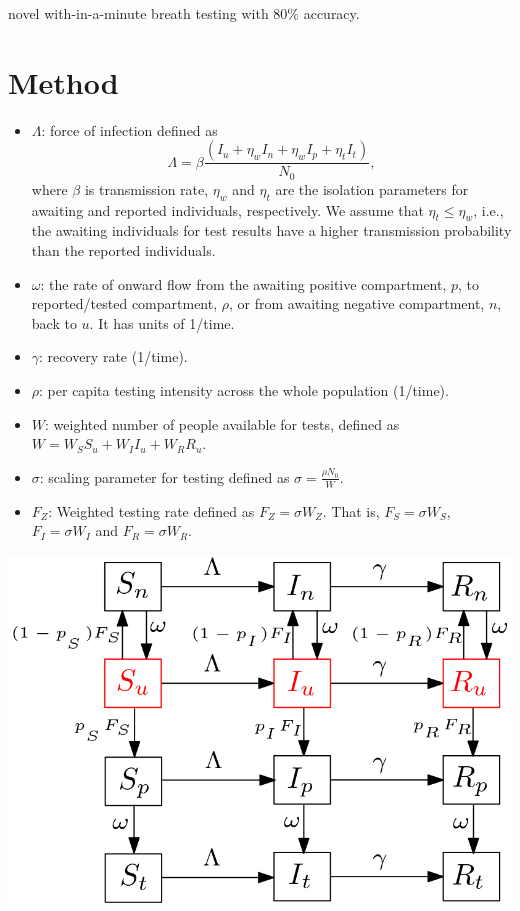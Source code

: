 \documentclass{article}
\begin{document}
\citep{ruszkiewicz2020diagnosis} novel with-in-a-minute breath testing with 80\% accuracy. 

\section{Method}
\begin{itemize}
\item $\Lambda$: force of infection defined as $$\Lambda=\beta \frac{(I_u+\eta_w I_n+\eta_w I_p+ \eta_t I_t)}{N_0},$$ where $\beta$ is transmission rate, $\eta_w$ and $\eta_t$ are the isolation parameters for awaiting and reported individuals, respectively. We assume that $\eta_t \leq \eta_w$, i.e., the awaiting individuals for test results have a higher transmission probability than the reported individuals.
\item $\omega$: the rate of onward flow from the awaiting positive compartment, $p$, to reported/tested compartment, $\rho$, or from awaiting negative compartment, $n$, back to $u$.  It has units of 1/time.
\item $\gamma$: recovery rate (1/time).
\item $\rho$: per capita testing intensity across the whole population (1/time).
\item $W$: weighted number of people available for tests, defined as $W = W_S S_u + W_I I_u + W_R R_u$.
\item $\sigma$: scaling parameter for testing defined as $\sigma = \frac{\rho N_0}{W}$.
\item $F_Z$: Weighted testing rate defined as $F_Z=\sigma W_Z$. That is, $F_S = \sigma W_S$, $F_I=\sigma W_I$ and $F_R = \sigma W_R$.
\end{itemize}

\includegraphics[width=\linewidth]{./pix/sir_comp.png}
\end{document}

